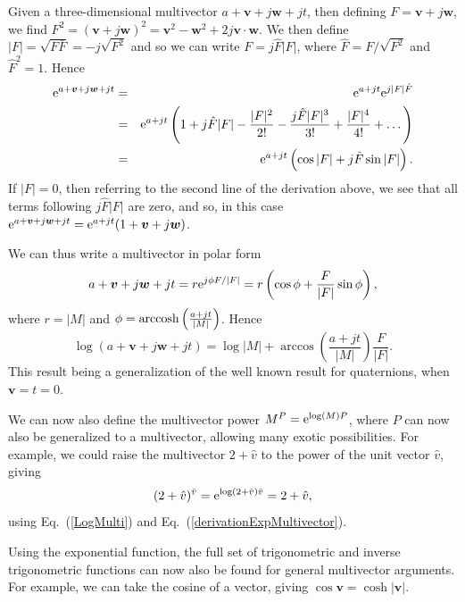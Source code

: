 \documentclass[prb,preprint]{revtex4}
\newcommand{\be}{\begin{equation}}
\newcommand{\ee}{\end{equation}}
\newcommand{\bea}{\begin{eqnarray}}
\newcommand{\eea}{\end{eqnarray}}
\newcommand{\rme}{{\rm{e}}}
\newcommand{\iGA}{{j}}
\newcommand{\cliffconj}[1] { \bar{#1} }
\begin{document}
Given a three-dimensional multivector $ a + \boldsymbol{v} + \iGA \boldsymbol{w} + \iGA t $, then defining $ F = \boldsymbol{v} +  \iGA \boldsymbol{w} $, we find $ F^2 = (\boldsymbol{v} + \iGA \boldsymbol{w})^2 = \boldsymbol{v}^2 - \boldsymbol{w}^2 + 2 \iGA \boldsymbol{v} \cdot \boldsymbol{w} $. We then define $  | F | = \sqrt{F \cliffconj{F}} = - \iGA \sqrt{F^2}  $ and so we can write $ F = \iGA \hat{F} | F | $, where $ \hat{F} = F/\sqrt{F^2} $ and $ \hat{F}^2 = 1 $.  Hence
\bea \label{derivationExpMultivector}
\rme^{a + \boldsymbol{v} + \iGA \boldsymbol{w} + \iGA t} & = & \rme^{a + \iGA t} \rme^{\iGA | F | \hat{F} } \\ \nonumber
& = & \rme^{a + \iGA t} \left ( 1 + j \hat{F} | F | - \frac{| F |^2 }{2!}- \frac{\iGA \hat{F} | F |^3}{3!} + \frac{| F |^4 }{4!} + \dots  \right ) \\ \nonumber
& = & \rme^{a + \iGA t} \left ( \cos | F | + \iGA \hat{F}  \sin | F |   \right ) . \nonumber
\eea
If $ | F | = 0 $, then referring to the second line of the derivation above, we see that all terms following $ \iGA \hat{F} | F | $ are zero, and so, in this case $ \rme^{a + \boldsymbol{v} + \iGA \boldsymbol{w} + \iGA t} = \rme^{a + \iGA t} (1+ \boldsymbol{v} + \iGA \boldsymbol{w} ) $. 

We can thus write a multivector in polar form 
\be
a + \boldsymbol{v} + \iGA \boldsymbol{w} + \iGA t  = r \rme^{\iGA \phi F/|F| } = r \left ( \cos \phi + \frac{F }{|F|} \sin \phi \right ),
\ee
where $ r = | M | $ and $ \phi = {\rm{arccosh}} \left ( \frac{a + \iGA t}{|M|} \right ) $. Hence
\be \label{LogMulti}
\log(a + \boldsymbol{v} + \iGA \boldsymbol{w} + \iGA t ) = \log |M| + \arccos \left ( \frac{a + \iGA t}{|M|} \right ) \frac{F }{|F|} .
\ee
This result being a generalization of the well known result for quaternions, when $ \boldsymbol{v} = t = 0 $.

We can now also define the multivector power
$ M^P = \rme^{ \log ( M ) P } $, where $ P $ can now also be generalized to a multivector, allowing many exotic possibilities.
For example, we could raise the multivector $ 2 + \hat{v} $ to the power of the unit vector $ \hat{v} $, giving
\be
(2+\hat{v})^{\hat{v}} = \rme^{ \log ( 2+\hat{v} ) \hat{v} } = 2 +\hat{v}  ,
\ee
using Eq.~(\ref{LogMulti}) and Eq.~(\ref{derivationExpMultivector}).

Using the exponential function, the full set of trigonometric and inverse trigonometric functions can now also be found for general multivector arguments\cite{Chappell2015}.  For example, we can take the cosine of a vector, giving $ \cos \boldsymbol{v} = \cosh | \boldsymbol{v} | $.
\end{document}
